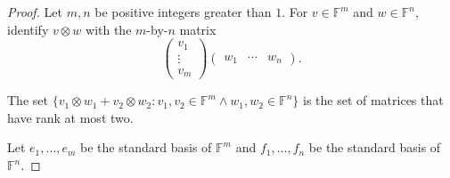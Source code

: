 \begin{proof}
    Let $m, n$ be positive integers greater than $1$. For $v\in\mathbb{F}^{m}$ and $w\in\mathbb{F}^{n}$, identify $v\otimes w$ with the $m$-by-$n$ matrix
    \[
        \begin{pmatrix}
            v_{1} \\ \vdots \\ v_{m}
        \end{pmatrix}
        \begin{pmatrix}
            w_{1} & \cdots & w_{n}
        \end{pmatrix}.
    \]

    The set $\{ v_{1}\otimes w_{1} + v_{2}\otimes w_{2}: v_{1}, v_{2}\in \mathbb{F}^{m}\land w_{1}, w_{2}\in \mathbb{F}^{n} \}$ is the set of matrices that have rank at most two.

    Let $e_{1}, \ldots, e_{m}$ be the standard basis of $\mathbb{F}^{m}$ and $f_{1}, \ldots, f_{n}$ be the standard basis of $\mathbb{F}^{n}$.


\end{proof}
